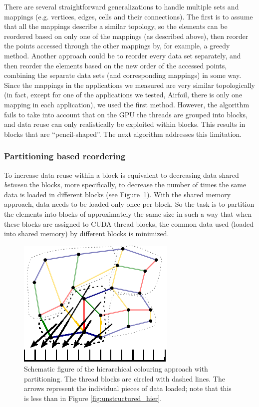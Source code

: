 There are several straightforward generalizations to handle multiple sets and
mappings (e.g. vertices, edges, cells and their connections).  The first is to
assume that all the mappings describe a similar topology, so the elements can be
reordered based on only one of the mappings (as described above), then reorder 
the points accessed through the other mappings by, for example, a greedy method.
Another approach could be to reorder every data set separately, and then reorder
the elements based on the new order of the accessed points, combining the
separate data sets (and corresponding mappings) in some way. Since the mappings
in the applications we measured are very similar topologically (in fact, except
for one of the applications we tested, Airfoil, there is only one mapping in 
each application), we used the first method. However, the algorithm fails to 
take into account that on the GPU the threads are grouped into blocks, and data 
reuse can only realistically be exploited within blocks. This results in blocks that are ``pencil-shaped''. The next algorithm 
addresses this limitation.

\subsubsection{Partitioning based reordering}

\noindent To increase data reuse within a block is equivalent to decreasing 
data shared \emph{between} the blocks, more specifically, to decrease the 
number of times the same data is loaded in different blocks (see 
Figure~\ref{fig:unstructured_part}). With the shared memory approach, data needs 
to be loaded only once per block. So the task is to partition the elements into 
blocks of approximately the same size in such a way that when these blocks are 
assigned to CUDA thread blocks, the common data used (loaded into shared 
memory) by different blocks is minimized.

\begin{figure}[Htpb]
  \centering
  \includegraphics{fig/svg/unstructured_part.eps}
  \caption{Schematic figure of the hierarchical colouring approach with
  partitioning. The thread blocks are circled with dashed lines. The arrows
  represent the individual pieces of data loaded; note that this is less than
  in Figure \ref{fig:unstructured_hier}.}
  \label{fig:unstructured_part}
\end{figure}

